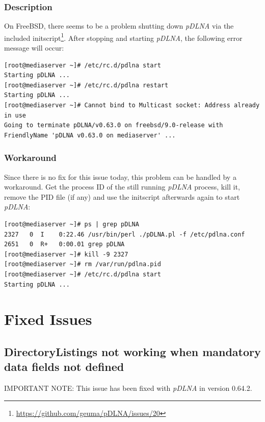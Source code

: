 \documentclass[a4paper,oneside,10pt]{report}
\newenvironment{colframeimportantnote}{%
  \begin{Sbox}
    \begin{minipage}{.99\columnwidth}
}{%
  \end{minipage}
  \end{Sbox}
  \begin{center}
    \fcolorbox{black}{Orange}{\TheSbox}
  \end{center}
}
\begin{document}
\subsection{Description}

On FreeBSD, there seems to be a problem shutting down {\em pDLNA} via the included initscript\footnote{\url{https://github.com/geuma/pDLNA/issues/20}}. After stopping and starting {\em pDLNA}, the following error message will occur:
\begin{lstlisting}
[root@mediaserver ~]# /etc/rc.d/pdlna start
Starting pDLNA ...
[root@mediaserver ~]# /etc/rc.d/pdlna restart
Starting pDLNA ...
[root@mediaserver ~]# Cannot bind to Multicast socket: Address already in use
Going to terminate pDLNA/v0.63.0 on freebsd/9.0-release with FriendlyName 'pDLNA v0.63.0 on mediaserver' ...
\end{lstlisting}

\subsection{Workaround}

Since there is no fix for this issue today, this problem can be handled by a workaround. Get the process ID of the still running {\em pDLNA} process, kill it, remove the PID file (if any) and use the initscript afterwards again to start {\em pDLNA}:
\begin{lstlisting}
[root@mediaserver ~]# ps | grep pDLNA
2327   0  I    0:22.46 /usr/bin/perl ./pDLNA.pl -f /etc/pdlna.conf
2651   0  R+   0:00.01 grep pDLNA
[root@mediaserver ~]# kill -9 2327
[root@mediaserver ~]# rm /var/run/pdlna.pid
[root@mediaserver ~]# /etc/rc.d/pdlna start
Starting pDLNA ...
\end{lstlisting}

%
%

\chapter{Fixed Issues}
\label{fixedissues}

\section{DirectoryListings not working when mandatory data fields not defined}

\begin{colframeimportantnote}
\textsc{IMPORTANT NOTE:} This issue has been fixed with {\em pDLNA} in version 0.64.2.
\end{colframeimportantnote}
\end{document}
